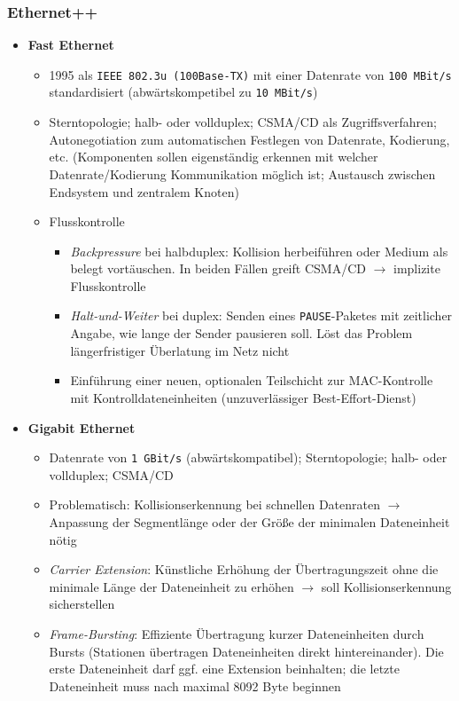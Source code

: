 \subsubsection{Ethernet++}
\begin{itemize}
	\item \textbf{Fast Ethernet}
	\begin{itemize}
		\item 1995 als \texttt{IEEE 802.3u (100Base-TX)} mit einer Datenrate von \texttt{100 MBit/s} standardisiert (abwärtskompetibel zu \texttt{10 MBit/s})
		\item Sterntopologie; halb- oder vollduplex; CSMA/CD als Zugriffsverfahren; Autonegotiation zum automatischen Festlegen von Datenrate, Kodierung, etc. (Komponenten sollen eigenständig erkennen mit welcher Datenrate/Kodierung Kommunikation möglich ist; Austausch zwischen Endsystem und zentralem Knoten)
		\item Flusskontrolle
		\begin{itemize}
			\item \textit{Backpressure} bei halbduplex: Kollision herbeiführen oder Medium als belegt vortäuschen. In beiden Fällen greift CSMA/CD \(\rightarrow\) implizite Flusskontrolle
			\item \textit{Halt-und-Weiter} bei duplex: Senden eines \texttt{PAUSE}-Paketes mit zeitlicher Angabe, wie lange der Sender pausieren soll. Löst das Problem längerfristiger Überlatung im Netz nicht
			\item Einführung einer neuen, optionalen Teilschicht zur MAC-Kontrolle mit Kontrolldateneinheiten (unzuverlässiger Best-Effort-Dienst)
		\end{itemize}
	\end{itemize}
	\item \textbf{Gigabit Ethernet}
	\begin{itemize}
		\item Datenrate von \texttt{1 GBit/s} (abwärtskompatibel); Sterntopologie; halb- oder vollduplex; CSMA/CD
		\item Problematisch: Kollisionserkennung bei schnellen Datenraten \(\rightarrow\) Anpassung der Segmentlänge oder der Größe der minimalen Dateneinheit nötig
		\item \textit{Carrier Extension}: Künstliche Erhöhung der Übertragungszeit ohne die minimale Länge der Dateneinheit zu erhöhen \(\rightarrow\) soll Kollisionserkennung sicherstellen
		\item \textit{Frame-Bursting}: Effiziente Übertragung kurzer Dateneinheiten durch Bursts (Stationen übertragen Dateneinheiten direkt hintereinander). Die erste Dateneinheit darf ggf. eine Extension beinhalten; die letzte Dateneinheit muss nach maximal 8092 Byte beginnen

\end{itemize}
\end{itemize}

